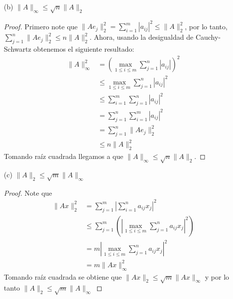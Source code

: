 \begin{enumerate}
\begin{proof}
    Por último, note que las componentes de la diagonal de $A^TA$ son de la forma $u_{jj}=\sum_{i=1}^m a_{ij}^2$, por lo tanto la traza de $A^TA$ es
    \[
    \sum_{j=1}^n\sum_{i=1}^{m}|a_{ij}|^2=\|A\|_F^2
    \]
    y ya que la traza de una matriz es igual a la suma de sus valores propios, y como $A^TA$ es semidefinida positiva, obtenemos que: 
    \begin{align*}
    \lambda_{max}(A^TA)&\leq \text{tr}(A^TA) \\
    \sqrt{\lambda_{max}(A^TA)} & \leq \sqrt{\text{tr}(A^TA)}\\ 
    \|A\|_2\ & \leq \|A\|_F
    \end{align*}
    \end{proof}
    \item[(b)] $\|A\|_\infty \leq \sqrt{n} \|A\|_2$
    \begin{proof}
    Primero note que $\|Ae_j\|_2^2=\sum_{i=1}^m |a_{ij}|^2\leq \|A\|_2^2$, por lo tanto, $\sum_{j=1}^n \|Ae_j\|_2^2\leq n\|A\|_2^2$. Ahora, usando la desigualdad de Cauchy-Schwartz obtenemos el siguiente resultado:
    \begin{align*}
    \|A\|_\infty^{2} & =\left(\max_{1\leq i \leq m}{\sum_{j=1}^n|a_{ij}|}\right)^2\\ 
        &\leq \max_{1\leq i \leq m}{\sum_{j=1}^n|a_{ij}|^2}\\   
        &\leq \sum_{i=1}^m\sum_{j=1}^{n}|a_{ij}|^2\\ 
        &= \sum_{j=1}^n\sum_{i=1}^{m}|a_{ij}|^2\\
        &= \sum_{j=1}^n \|Ae_j\|_2^2\\
        &\leq n\|A\|_2^2
    \end{align*}
    Tomando raíz cuadrada llegamos a que $\|A\|_\infty \leq \sqrt{n}\|A\|_2$.
    \end{proof}
    \item[(c)] $\|A\|_2 \leq \sqrt{m} \|A\|_\infty$
    \begin{proof}
    Note que
    \begin{align*}
    \|Ax\|_2^2 &= \sum_{j=1}^m\left|\sum_{i=1}^n a_{ij}x_{j}\right|^2\\ 
    &\leq \sum_{j=1}^m\left(\left|\max_{1\leq i \leq m}{\sum_{j=1}^n a_{ij}x_{j}}\right|^2\right)\\ 
    &= m\left|\max_{1\leq i \leq m}{\sum_{j=1}^n a_{ij}x_{j}}\right|^2\\ 
    &= m\|Ax\|_\infty^2
    \end{align*}
    Tomando raíz cuadrada se obtiene que $\|Ax\|_2\leq \sqrt{m}\|Ax\|_\infty$ y por lo tanto $\|A\|_2 \leq\sqrt{m} \|A\|_\infty$

\end{proof}
\end{enumerate}
